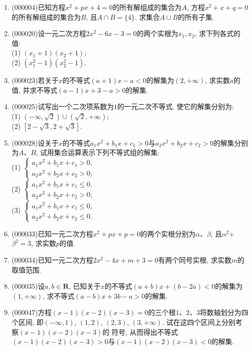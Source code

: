 \documentclass[10pt,a4paper]{article}
\begin{document}
\begin{enumerate}[1.]

\item {\tiny (000004)}已知方程$x^2+px+4=0$的所有解组成的集合为$A$, 方程$x^2+x+q=0$的所有解组成的集合为$B$, 且$A\cap B=\{4\}$. 求集合$A\cup B$的所有子集.
\item {\tiny (000020)}设一元二次方程$2x^2-6x-3=0$的两个实根为$x_1,x_2$, 求下列各式的值:\\
(1) $(x_1+1)(x_2+1)$;\\
(2) $(x_1^2-1)(x_2^2-1)$.
\item {\tiny (000023)}若关于$x$的不等式$(a+1)x-a<0$的解集为$(2,+\infty)$, 求实数$a$的值, 并求不等式$(a-1)x+3-a>0$的解集.
\item {\tiny (000025)}试写出一个二次项系数为$1$的一元二次不等式, 使它的解集分别为:\\
(1) $(-\infty, \sqrt 2)\cup  (\sqrt 2, +\infty)$;\\
(2) $[2-\sqrt 3, 2+\sqrt 3]$.
\item {\tiny (000028)}设关于$x$的不等式$a_1x^2+b_1x+c_1>0$与$a_2x^2+b_2x+c_2>0$的解集分别为$A$、$B$,
试用集合运算表示下列不等式组的解集:\\
(1) $\begin{cases} a_1x^2+b_1x+c_1>0, \\ a_2x^2+b_2x+c_2>0;\end{cases}$\\
(2) $\begin{cases} a_1x^2+b_1x+c_1\le 0, \\ a_2x^2+b_2x+c_2>0;\end{cases}$\\
(3) $\begin{cases} a_1x^2+b_1x+c_1\le 0, \\ a_2x^2+b_2x+c_2\le 0.\end{cases}$
\item {\tiny (000033)}已知一元二次方程$x^2+px+p=0$的两个实根分别为$\alpha$、$\beta$, 且$\alpha^2$+$\beta^2=3$, 求实数$p$的值.
\item {\tiny (000034)}已知一元二次方程$2x^2-4x+m+3=0$有两个同号实根, 求实数$m$的取值范围.
\item {\tiny (000035)}设$a,b\in \mathbf{R}$, 已知关于$x$的不等式$(a+b)x+(b-2a)<0$的解集为$(1, +\infty)$, 求不等式$(a-b)x+3b-a>0$的解集.
\item {\tiny (000047)}方程$(x-1)(x-2)(x-3)=0$的三个根$1$、$2$、$3$将数轴划分为四个区间, 即$(-\infty, 1)$, $(1, 2)$, $(2, 3)$, $(3, +\infty)$. 试在这四个区间上分别考察$(x-1)(x-2)(x-3)$的
符号, 从而得出不等式$(x-1)(x-2)(x-3)>0$与$(x-1)(x-2)(x-3)<0$的解集.\\

\end{enumerate}
\end{document}
